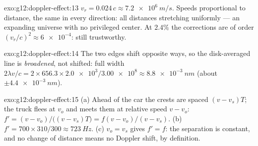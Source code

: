 \begin{solution}{exo:g12:doppler-effect:13}
$v_r = 0.024\,c \approx \qty{7.2e6}{m/s}$. Speeds proportional to distance, the same in
every direction: all distances stretching uniformly --- an expanding universe with no
privileged center. At $2.4\%$ the corrections are of order $(v_r/c)^2 \approx
\num{6e-4}$: still trustworthy.
\end{solution}

\begin{solution}{exo:g12:doppler-effect:14}
The two edges shift opposite ways, so the disk-averaged line is \emph{broadened}, not
shifted: full width $2\lambda v/c = 2 \times 656.3 \times \num{2.0e3}/\num{3.00e8}
\approx \qty{8.8e-3}{nm}$ (about $\pm\qty{4.4e-3}{nm}$).
\end{solution}

\begin{solution}{exo:g12:doppler-effect:15}
(a) Ahead of the car the crests are spaced $(v - v_s)T$; the truck flees at $v_o$ and
meets them at relative speed $v - v_o$: $f' = (v - v_o)/\bigl((v - v_s)T\bigr) =
f(v - v_o)/(v - v_s)$. (b) $f' = 700 \times 310/300 \approx \qty{723}{Hz}$.
(c) $v_o = v_s$ gives $f' = f$: the separation is constant, and no change of distance
means no Doppler shift, by definition.
\end{solution}

